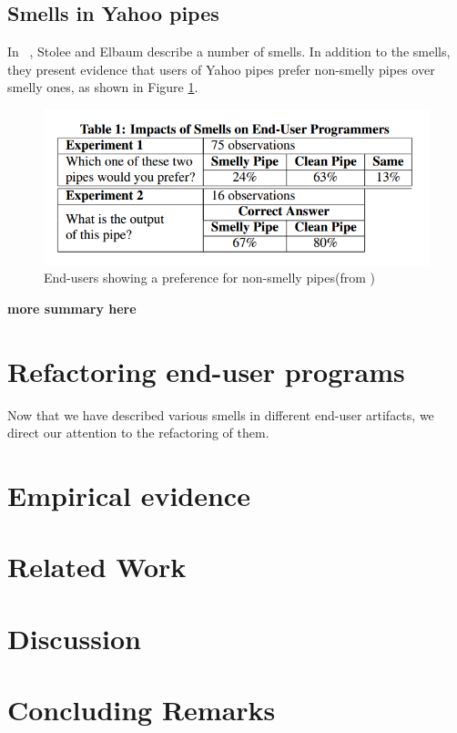 \documentclass[10pt,conference,compsocconf]{IEEEtran}
\newcommand{\todo}[1]{\textbf{#1}}
\begin{document}
\subsection{Smells in Yahoo pipes}
In ~\cite{Stolee2011}, Stolee and Elbaum describe a number of smells. In addition to the smells, they present evidence that users of Yahoo pipes prefer non-smelly pipes over smelly ones, as shown in Figure \ref{fig:Table1-Stolee2011}.

\begin{figure}[ht!]
\centering
\includegraphics[width=\columnwidth]{Table1-Stolee2011.png}
\caption{End-users showing a preference for non-smelly pipes(from \cite{Stolee2011})}
\label{fig:Table1-Stolee2011}
\end{figure}

\todo{more summary here}

\section{Refactoring end-user programs}
\label{sec:refactoring}
Now that we have described various smells in different end-user artifacts, we direct our attention to the refactoring of them. 

\section{Empirical evidence}
\label{sec:empirical}


\section{Related Work}
\label{sec:related_work}

\section{Discussion}
\label{sec:discussion}


\section{Concluding Remarks}
\label{sec:conclusions}
\end{document}
